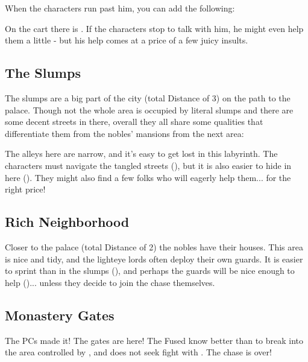 When the characters run past him, you can add the following:


On the cart there is \npcHoid{}. If the characters stop to talk with him, he might even help them a little - but his help comes at a price of a few juicy insults.






\subsection{The Slumps}

The slumps are a big part of the city (total Distance of 3) on the path to the palace. Though not the whole area is occupied by literal slumps and there are some decent streets in there, overall they all share some qualities that differentiate them from the nobles' mansions from the next area:

The alleys here are narrow, and it's easy to get lost in this labyrinth. The characters must navigate the tangled streets (\skillDeduction{}), but it is also easier to hide in here (\skillStealth{}). They might also find a few folks who will eagerly help them... for the right price!


\subsection{Rich Neighborhood}

Closer to the palace (total Distance of 2) the nobles have their houses. This area is nice and tidy, and the lighteye lords often deploy their own guards. It is easier to sprint than in the slumps (\skillAthletics{}), and perhaps the guards will be nice enough to help (\skillPersuasion{})... unless they decide to join the chase themselves.



\subsection{Monastery Gates}

The PCs made it! The gates are here! The Fused know better than to break into the area controlled by \npcHeartRevel{}, and \npcHighmarshal{} does not seek fight with \npcFractionCult{}. The chase is over!
